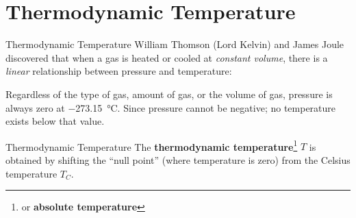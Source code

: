 \documentclass[12pt,aspectratio=169]{beamer}
\begin{document}
\section{Thermodynamic Temperature}

\begin{frame}{Thermodynamic Temperature}
  William Thomson (Lord Kelvin) and James Joule discovered that when a gas is
  heated or cooled at \emph{constant volume}, there is a \emph{linear}
  relationship between pressure and temperature:
  \begin{center}
  \end{center}
  Regardless of the type of gas, amount of gas, or the volume of gas, pressure
  is always zero at \SI{-273.15}{\celsius}. Since pressure cannot be negative;
  no temperature exists below that value.
\end{frame}



\begin{frame}{Thermodynamic Temperature}
  The \textbf{thermodynamic temperature}\footnote{or \textbf{absolute
      temperature}} $T$
  is obtained by shifting the ``null point'' (where temperature is zero) from
  the Celsius temperature $T_C$.
  
  \vspace{.25in}
\end{frame}
  
\end{document}
